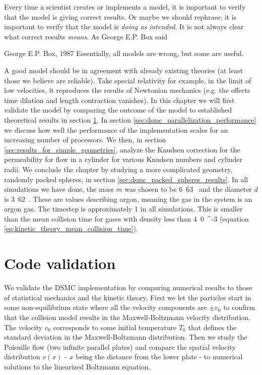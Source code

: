 Every time a scientist creates or implements a model, it is important to verify that the model is giving correct results. Or maybe we should rephrase; it is important to verify that the model is \textit{doing as intended}. It is not always clear what correct results \textit{means}. As George E.P. Box said
\begin{aquote}{George E.P. Box, 1987}
Essentially, all models are wrong, but some are useful.
\end{aquote}
A good model should be in agreement with already existing theories (at least those we believe are reliable). Take special relativity for example, in the limit of low velocities, it reproduces the results of Newtonian mechanics (e.g. the effects time dilation and length contraction vanishes). In this chapter we will first validate the model by comparing the outcome of the model to established theoretical results in section \ref{sec:dsmc_code_validation}. In section \ref{sec:dsmc_parallelization_performance} we discuss how well the performance of the implementation scales for an increasing number of processors. We then, in section \ref{sec:results_for_simple_geometries}, analyze the Knudsen correction for the permeability for flow in a cylinder for various Knudsen numbers and cylinder radii. We conclude the chapter by studying a more complicated geometry, randomly packed spheres, in section \ref{sec:dsmc_packed_spheres_results}. In all simulations we have done, the mass $m$ was chosen to be \unit{6.63}{\kilo\gram} and the diameter $d$ is \unit{3.62}{\meter}. These are values describing argon, meaning the gas in the system is an argon gas. The timestep is approximately \unit{1}{\pico\second} in all simulations. This is smaller than the mean collision time for gases with density less than \unit{4.0}{\meter^{-3}} (equation \eqref{eq:kinetic_theory_mean_collision_time}).

\section{Code validation}
\label{sec:dsmc_code_validation}
We validate the DSMC implementation by comparing numerical results to those of statistical mechanics and the kinetic theory. First we let the particles start in some non-equilibrium state where all the velocity components are $\pm v_0$ to confirm that the collision model results in the Maxwell-Boltzmann velocity distribution. The velocity $v_0$ corresponds to some initial temperature $T_0$ that defines the standard deviation in the Maxwell-Boltzmann distribution. Then we study the Poisuille flow (two infinite parallel plates) and compare the spatial velocity distribution $v(x)$ - $x$ being the distance from the lower plate - to numerical solutions to the linearized Boltzmann equation.
